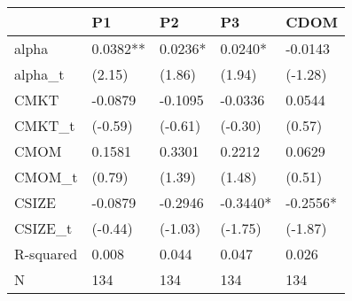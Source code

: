 \begin{tabular}{lllll}
\toprule
 & P1 & P2 & P3 & CDOM \\
\midrule
alpha & 0.0382** & 0.0236* & 0.0240* & -0.0143 \\
alpha_t & (2.15) & (1.86) & (1.94) & (-1.28) \\
CMKT & -0.0879 & -0.1095 & -0.0336 & 0.0544 \\
CMKT_t & (-0.59) & (-0.61) & (-0.30) & (0.57) \\
CMOM & 0.1581 & 0.3301 & 0.2212 & 0.0629 \\
CMOM_t & (0.79) & (1.39) & (1.48) & (0.51) \\
CSIZE & -0.0879 & -0.2946 & -0.3440* & -0.2556* \\
CSIZE_t & (-0.44) & (-1.03) & (-1.75) & (-1.87) \\
R-squared & 0.008 & 0.044 & 0.047 & 0.026 \\
N & 134 & 134 & 134 & 134 \\
\bottomrule
\end{tabular}
